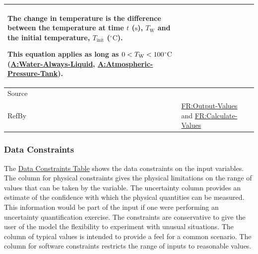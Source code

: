 \documentclass[12pt]{article}
\newcommand{\lt}{\ensuremath <}
\begin{document}
\begin{minipage}{\textwidth}
\begin{tabular}{>{\raggedright}p{}>{\raggedright\arraybackslash}p{}}
        The change in temperature is the difference between the temperature at time $t$ (${\text{s}}$), ${T_{\text{W}}}$ and the initial temperature, ${T_{\text{init}}}$ (${{}^{\circ}\text{C}}$).
        
        This equation applies as long as $0\lt{}{T_{\text{W}}}\lt{}100$${{}^{\circ}\text{C}}$ (\hyperref[assumpWAL]{A:Water-Always-Liquid}, \hyperref[assumpAPT]{A:Atmospheric-Pressure-Tank}).
        
\\ \midrule
Source & \cite{koothoor2013}
         
\\ \midrule
RefBy & \hyperref[outputValues]{FR:Output-Values} and \hyperref[calcValues]{FR:Calculate-Values}
        
\\ \bottomrule
\end{tabular}
\end{minipage}

\subsubsection{Data Constraints}
\label{Sec:DataConstraints}
The \hyperref[Table:InDataConstraints]{Data Constraints Table} shows the data constraints on the input variables. The column for physical constraints gives the physical limitations on the range of values that can be taken by the variable. The uncertainty column provides an estimate of the confidence with which the physical quantities can be measured. This information would be part of the input if one were performing an uncertainty quantification exercise. The constraints are conservative to give the user of the model the flexibility to experiment with unusual situations. The column of typical values is intended to provide a feel for a common scenario. The column for software constraints restricts the range of inputs to reasonable values.
\end{document}
